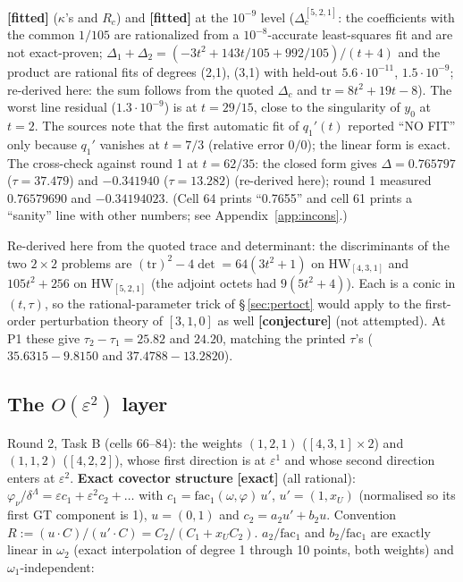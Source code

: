 \documentclass[10pt]{article}
\begin{document}
\textbf{[fitted]} ($\kappa$'s and $R_c$) and \textbf{[fitted]} at the $10^{-9}$ level ($\Delta_c^{[5,2,1]}$: the coefficients with the common $1/105$ are rationalized from a $10^{-8}$-accurate least-squares fit and are not exact-proven; $\Delta_1+\Delta_2=(-3t^2+143t/105+992/105)/(t+4)$ and the product are rational fits of degrees (2,1), (3,1) with held-out $5.6\cdot10^{-11}$, $1.5\cdot10^{-9}$; re-derived here: the sum follows from the quoted $\Delta_c$ and $\mathrm{tr}=8t^2+19t-8$). The worst line residual ($1.3\cdot10^{-9}$) is at $t=29/15$, close to the singularity of $y_0$ at $t=2$. The sources note that the first automatic fit of $q_1'(t)$ reported ``NO FIT'' only because $q_1'$ vanishes at $t=7/3$ (relative error $0/0$); the linear form is exact. The cross-check against round 1 at $t=62/35$: the closed form gives $\Delta=0.765797$ ($\tau=37.479$) and $-0.341940$ ($\tau=13.282$) (re-derived here); round 1 measured $0.76579690$ and $-0.34194023$. (Cell 64 prints ``0.7655'' and cell 61 prints a ``sanity'' line with other numbers; see Appendix~\ref{app:incons}.)

Re-derived here from the quoted trace and determinant: the discriminants of the two $2\times2$ problems are $(\mathrm{tr})^2-4\det=64(3t^2+1)$ on $\mathrm{HW}_{[4,3,1]}$ and $105t^2+256$ on $\mathrm{HW}_{[5,2,1]}$ (the adjoint octets had $9(5t^2+4)$). Each is a conic in $(t,\tau)$, so the rational-parameter trick of \S\,\ref{sec:pertoct} would apply to the first-order perturbation theory of $[3,1,0]$ as well \textbf{[conjecture]} (not attempted). At P1 these give $\tau_2-\tau_1=25.82$ and $24.20$, matching the printed $\tau$'s ($35.6315-9.8150$ and $37.4788-13.2820$).

\subsection{The $O(\varepsilon^2)$ layer}\label{sec:a310E2}

Round 2, Task B (cells 66--84): the weights $(1,2,1)$ ($[4,3,1]\times2$) and $(1,1,2)$ ($[4,2,2]$), whose first direction is at $\varepsilon^1$ and whose second direction enters at $\varepsilon^2$. \textbf{Exact covector structure} \textbf{[exact]} (all rational): $\varphi_\nu/\delta^\Lambda=\varepsilon c_1+\varepsilon^2c_2+\dots$ with $c_1=\mathrm{fac}_1(\omega,\varphi)\,u'$, $u'=(1,x_U)$ (normalised so its first GT component is 1), $u=(0,1)$ and $c_2=a_2u'+b_2u$. Convention $R:=(u\cdot C)/(u'\cdot C)=C_2/(C_1+x_UC_2)$. $a_2/\mathrm{fac}_1$ and $b_2/\mathrm{fac}_1$ are exactly linear in $\omega_2$ (exact interpolation of degree 1 through 10 points, both weights) and $\omega_1$-independent:
\end{document}
